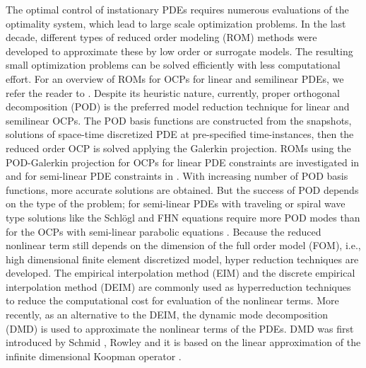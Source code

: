 \documentclass[preprint,12pt]{elsarticle}
\begin{document}
The optimal control of instationary PDEs requires numerous evaluations of the optimality system, which lead to large scale optimization problems. In the last decade, different types of reduced order modeling (ROM) methods were developed to approximate these by low order or surrogate models. The resulting small optimization problems can be solved efficiently with less computational effort. For an overview of ROMs for OCPs for linear and semilinear PDEs, we refer the reader to \cite{Benner14tip,Gubisch17}. Despite its heuristic nature, currently, proper orthogonal decomposition (POD) is the preferred model reduction technique for linear and semilinear  OCPs. The POD basis functions are constructed from the snapshots, solutions of space-time discretized PDE at pre-specified time-instances, then the reduced order OCP  is solved applying the Galerkin projection.   ROMs using the POD-Galerkin projection for OCPs for linear PDE constraints are investigated in \cite{Hinze08,Kunisch08pod,Troltzsch08} and for semi-linear PDE constraints in   \cite{Kammann13,Studinger13,Kunisch15}. With increasing number of POD basis functions, more accurate solutions are obtained. But the success of POD depends on the type of the problem; for semi-linear PDEs with traveling or spiral wave type solutions like the Schl\"ogl and FHN equations \cite{buchholz13ocs,Ryll16,Ryll14pod} require more POD modes than for the OCPs with semi-linear parabolic equations \cite{Kammann13}. Because the reduced nonlinear term still depends on the dimension of the full order model (FOM), i.e., high dimensional finite element discretized model, hyper reduction techniques are developed.  The empirical interpolation method (EIM) \cite{Barrault04} and the discrete empirical interpolation method (DEIM) \cite{chaturantabut10nmr} are commonly used as hyperreduction techniques to reduce the computational cost for evaluation of the nonlinear terms.  More recently, as an alternative to the DEIM, the dynamic mode decomposition (DMD) \cite{Alla16} is used to approximate the nonlinear terms of the PDEs. DMD was first introduced by Schmid \cite{Schmid10dmd}, Rowley \cite{Rowley12} and it is based on the linear approximation of the infinite dimensional Koopman operator \cite{Koopman31,Kutz16}.
\end{document}
